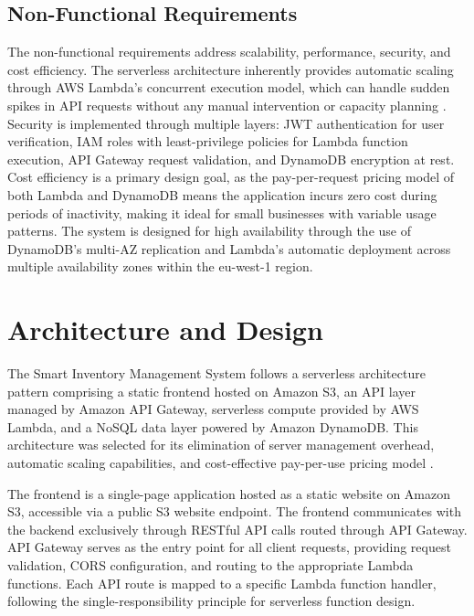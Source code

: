 \documentclass[conference]{IEEEtran}
\begin{document}
\subsection{Non-Functional Requirements}

The non-functional requirements address scalability, performance, security, and cost efficiency. The serverless architecture inherently provides automatic scaling through AWS Lambda's concurrent execution model, which can handle sudden spikes in API requests without any manual intervention or capacity planning \cite{awslambda}. Security is implemented through multiple layers: JWT authentication for user verification, IAM roles with least-privilege policies for Lambda function execution, API Gateway request validation, and DynamoDB encryption at rest. Cost efficiency is a primary design goal, as the pay-per-request pricing model of both Lambda and DynamoDB means the application incurs zero cost during periods of inactivity, making it ideal for small businesses with variable usage patterns. The system is designed for high availability through the use of DynamoDB's multi-AZ replication and Lambda's automatic deployment across multiple availability zones within the eu-west-1 region.

\section{Architecture and Design}

The Smart Inventory Management System follows a serverless architecture pattern comprising a static frontend hosted on Amazon S3, an API layer managed by Amazon API Gateway, serverless compute provided by AWS Lambda, and a NoSQL data layer powered by Amazon DynamoDB. This architecture was selected for its elimination of server management overhead, automatic scaling capabilities, and cost-effective pay-per-use pricing model \cite{serverlesspatterns}.

The frontend is a single-page application hosted as a static website on Amazon S3, accessible via a public S3 website endpoint. The frontend communicates with the backend exclusively through RESTful API calls routed through API Gateway. API Gateway serves as the entry point for all client requests, providing request validation, CORS configuration, and routing to the appropriate Lambda functions. Each API route is mapped to a specific Lambda function handler, following the single-responsibility principle for serverless function design.
\end{document}

